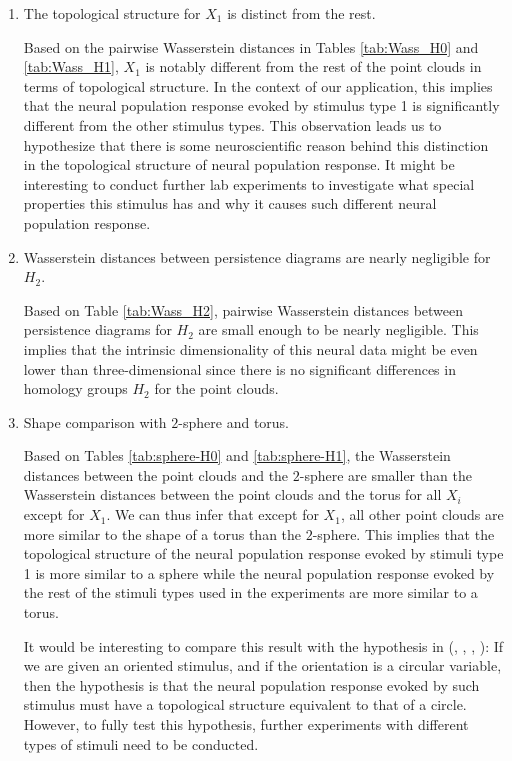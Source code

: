 \begin{enumerate}
    \item The topological structure for $X_1$ is distinct from the rest. 
    
    Based on the pairwise Wasserstein distances in Tables \ref{tab:Wass_H0} and \ref{tab:Wass_H1}, $X_1$ is notably different from the rest of the point clouds in terms of topological structure. In the context of our application, this implies that the neural population response evoked by stimulus type 1 is significantly different from the other stimulus types. This observation leads us to hypothesize that there is some neuroscientific reason behind this distinction in the topological structure of neural population response. It might be interesting to conduct further lab experiments to investigate what special properties this stimulus has and why it causes such different  neural population response. 
    
    \item Wasserstein distances between persistence diagrams are nearly negligible for $H_2$.
    
    Based on Table \ref{tab:Wass_H2}, pairwise Wasserstein distances between persistence diagrams for $H_2$ are small enough to be nearly negligible. This implies that the intrinsic dimensionality of this neural data might be even lower than three-dimensional since there is no significant differences in homology groups $H_2$ for the point clouds.
    
    \item Shape comparison with $2$-sphere and torus.
    
    Based on Tables \ref{tab:sphere-H0} and \ref{tab:sphere-H1}, the Wasserstein distances between the point clouds and the $2$-sphere are smaller than the Wasserstein distances between the point clouds and the torus for all $X_i$ except for $X_1$. We can thus infer that except for $X_1$, all other point clouds are more similar to the shape of a torus than the $2$-sphere. This implies that the topological structure of the neural population response evoked by stimuli type 1 is more similar to a sphere while the neural population response evoked by the rest of the stimuli types used in the experiments are more similar to a torus. 
    
    It would be interesting to compare this result with the hypothesis in (\cite{ben-yishai_theory_1995}, \cite{Blumenfeld_2006}, \cite{goldberg_randomized_2004},    \cite{singh_top_v1_2008}):
    If we are given an oriented stimulus, and if the orientation is a circular variable, then the hypothesis is that the neural population response evoked by such stimulus must have a topological structure equivalent to that of a circle. However, to fully test this hypothesis, further experiments with different types of stimuli need to be conducted.
\end{enumerate}

